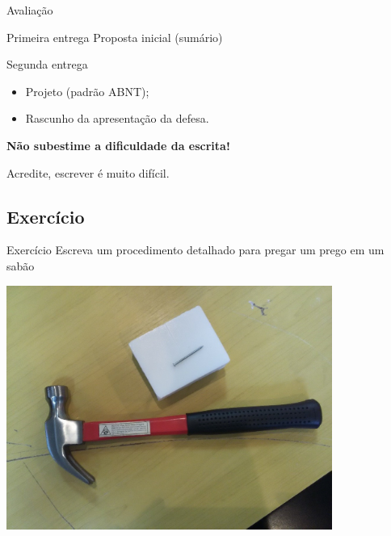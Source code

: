 \documentclass{beamer}
\begin{document}
\begin{frame}{Avaliação}
  \begin{block}{Primeira entrega}
    Proposta inicial (sumário)
  \end{block}

  \pause

  \begin{block}{Segunda entrega}
    \begin{itemize}
    \item Projeto (padrão ABNT);
    \item Rascunho da apresentação da defesa.
    \end{itemize}
  \end{block}

\end{frame}

\begin{frame}{}
  \begin{block}{}
    {\bf Não subestime a dificuldade da escrita!}

    Acredite, escrever é muito difícil.
  \end{block}

  \bigskip
  \bigskip
\end{frame}

\subsection{Exercício}

\begin{frame}{Exercício}
Escreva um procedimento detalhado para pregar um prego em um sabão

  \begin{center}
    \includegraphics[width=0.8\textwidth]{Intro/pregomartelo}
  \end{center}
\end{frame}
\end{document}
